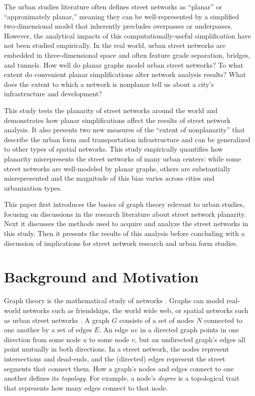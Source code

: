 \documentclass[Afour,sageh,times]{sagej}
\begin{document}
The urban studies literature often defines street networks as \enquote{planar} or \enquote{approximately planar,} meaning they can be well-represented by a simplified two-dimensional model that inherently precludes overpasses or underpasses. However, the analytical impacts of this computationally-useful simplification have not been studied empirically. In the real world, urban street networks are embedded in three-dimensional space and often feature grade separation, bridges, and tunnels. How well do planar graphs model urban street networks? To what extent do convenient planar simplifications alter network analysis results? What does the extent to which a network is nonplanar tell us about a city's infrastructure and development?

This study tests the planarity of street networks around the world and demonstrates how planar simplifications affect the results of street network analysis. It also presents two new measures of the \enquote{extent of nonplanarity} that describe the urban form and transportation infrastructure and can be generalized to other types of spatial networks. This study empirically quantifies how planarity misrepresents the street networks of many urban centers: while some street networks are well-modeled by planar graphs, others are substantially misrepresented and the magnitude of this bias varies across cities and urbanization types.

This paper first introduces the basics of graph theory relevant to urban studies, focusing on discussions in the research literature about street network planarity. Next it discusses the methods used to acquire and analyze the street networks in this study. Then it presents the results of this analysis before concluding with a discussion of implications for street network research and urban form studies.


\section{Background and Motivation}

Graph theory is the mathematical study of networks \citep{newman_networks:_2010}. Graphs can model real-world networks such as friendships, the world wide web, or spatial networks such as urban street networks \citep{barthelemy_spatial_2011}. A graph $G$ consists of a set of nodes $N$ connected to one another by a set of edges $E$. An edge $uv$ in a directed graph points in one direction from some node $u$ to some node $v$, but an undirected graph's edges all point mutually in both directions. In a street network, the nodes represent intersections and dead-ends, and the (directed) edges represent the street segments that connect them. How a graph's nodes and edges connect to one another defines its \emph{topology}. For example, a node's \emph{degree} is a topological trait that represents how many edges connect to that node.
\end{document}
